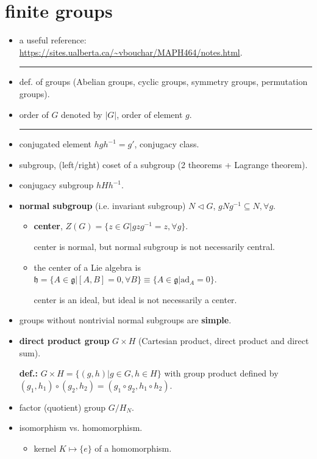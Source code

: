 \chapter{finite groups}
\begin{itemize}
	\item a useful reference: \url{https://sites.ualberta.ca/~vbouchar/MAPH464/notes.html}.
	
	\noindent\rule[0.5ex]{\linewidth}{0.5pt} %
	
	\item def. of groups (Abelian groups, cyclic groups, symmetry groups, permutation groups).
	
	\item order of $G$ denoted by $|G|$, order of element $g$.
	
	\noindent\rule[0.5ex]{\linewidth}{0.5pt} %
	
	\item conjugated element $h g h^{- 1} = g'$, conjugacy class.
	
	\item subgroup, (left/right) coset of a subgroup (2 theorems + Lagrange theorem).
	
	\item conjugacy subgroup $h H h^{- 1}$.
	
	\item \textbf{normal subgroup} (i.e. invariant subgroup) $N \triangleleft G$, $g N g^{- 1} \subseteq N, \forall g$.
	\begin{itemize}
		\item \textbf{center}, $Z(G) = \{z \in G | g z g^{- 1} = z, \forall g\}$.
		
		center is normal, but normal subgroup is not necessarily central.
		
		\item the center of a Lie algebra is $\mathfrak{h} = \{A \in \mathfrak{g} | [A, B] = 0, \forall B\} \equiv \{A \in \mathfrak{g} | \mathrm{ad}_A = 0\}$.
		
		center is an ideal, but ideal is not necessarily a center.
	\end{itemize}
	
	\item groups without nontrivial normal subgroups are \textbf{simple}.
	
	\item \textbf{direct product group} $G \times H$ (Cartesian product, direct product and direct sum).
	
	\textbf{def.:} $G \times H = \{(g, h) | g \in G, h \in H\}$ with group product defined by $(g_1, h_1) \circ (g_2, h_2) = (g_1 \circ g_2, h_1 \circ h_2)$.
	
	\item factor (quotient) group $G/H_N$.
	
	\item isomorphism vs. homomorphism.
	\begin{itemize}
		\item kernel $K \mapsto \{e\}$ of a homomorphism.
	\end{itemize}
\end{itemize}


